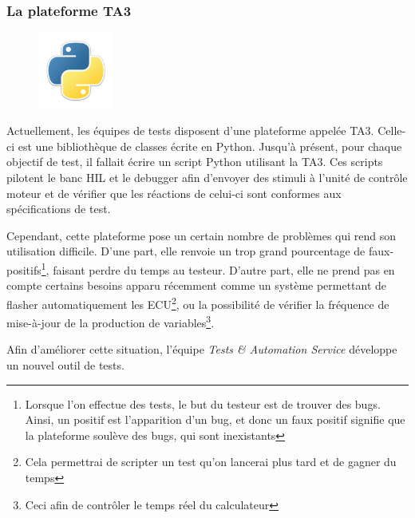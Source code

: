 			\subsubsection{La plateforme TA3}\label{ta3}
			\begin{figure}
				\includegraphics[width=2.5cm]{contents/images/python.png}
			\end{figure}
			Actuellement, les équipes de tests disposent d'une plateforme appelée TA3. Celle-ci est une bibliothèque de classes écrite en Python. Jusqu'à présent, pour chaque objectif de test, il fallait écrire un script Python utilisant la TA3. Ces scripts pilotent le banc HIL et le debugger afin d'envoyer des stimuli à l'unité de contrôle moteur et de vérifier que les réactions de celui-ci sont conformes aux spécifications de test.
			
			Cependant, cette plateforme pose un certain nombre de problèmes qui rend son utilisation difficile. D'une part, elle renvoie un trop grand pourcentage de faux-positifs\footnote{Lorsque l'on effectue des tests, le but du testeur est de trouver des bugs. Ainsi, un positif est l'apparition d'un bug, et donc un faux positif signifie que la plateforme soulève des bugs, qui sont inexistants}, faisant perdre du temps au testeur. D'autre part, elle ne prend pas en compte certains besoins apparu récemment comme un système permettant de flasher automatiquement les ECU\footnote{Cela permettrai de scripter un test qu'on lancerai plus tard et de gagner du temps}, ou la possibilité de vérifier la fréquence de mise-à-jour de la production de variables\footnote{Ceci afin de contrôler le temps réel du calculateur}.
			
			Afin d'améliorer cette situation, l'équipe \textit{Tests \& Automation Service} développe un nouvel outil de tests.
			
